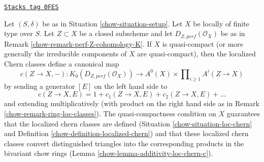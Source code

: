 \begin{remark}
\label{chow-remark-localized-chern-classes-K}
\href{https://stacks.math.columbia.edu/tag/0FES}{\texttt{Stacks tag 0FES}}

Let $(S, \delta)$ be as in Situation \ref{chow-situation-setup}.
Let $X$ be locally of finite type over $S$.
Let $Z \subset X$ be a closed subscheme and let
$D_{Z, perf}(\mathcal{O}_X)$ be as in
Remark \ref{chow-remark-perf-Z-cohomology-K}.
If $X$ is quasi-compact (or more generally the irreducible
components of $X$ are quasi-compact), then
the localized Chern classes define a canonical map
$$
c(Z \to X, -) : K_0(D_{Z, perf}(\mathcal{O}_X)) \longrightarrow
A^0(X) \times \prod\nolimits_{i \geq 1} A^i(Z \to X)
$$
by sending a generator $[E]$ on the left hand side to
$$
c(Z \to X, E) = 1 + c_1(Z \to X, E) + c_2(Z \to X, E) + \ldots
$$
and extending multiplicatively (with product on the right hand
side as in Remark \ref{chow-remark-ring-loc-classes}).
The quasi-compactness condition on $X$ guarantees that the
localized chern classes are defined (Situation \ref{chow-situation-loc-chern} and
Definition \ref{chow-definition-localized-chern})
and that these localized chern classes convert distinguished triangles into
the corresponding products in the bivariant chow rings
(Lemma \ref{chow-lemma-additivity-loc-chern-c}).
\end{remark}

